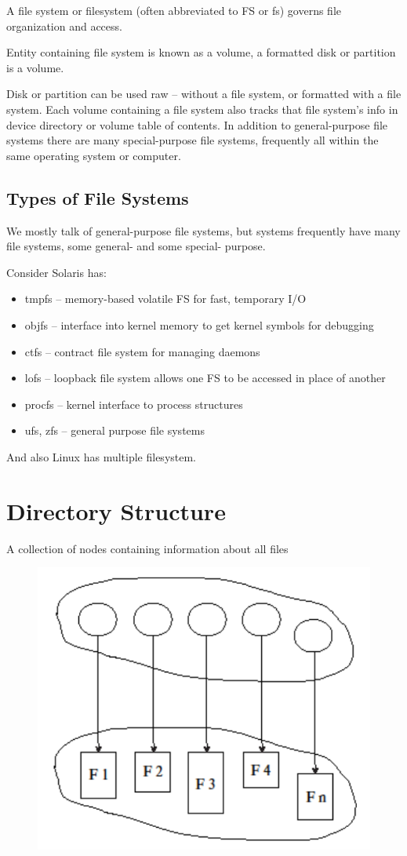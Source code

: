 A file system or filesystem (often abbreviated to FS or fs) governs
file organization and access.

Entity containing file system is known as a volume, a formatted disk or partition is a volume.

Disk or partition can be used raw – without a file system, or
formatted with a file system. Each volume containing a file system also tracks that file system’s
info in device directory or volume table of contents. In addition to general-purpose file systems there are many
special-purpose file systems, frequently all within the same
operating system or computer.

\subsection{Types of File Systems}
We mostly talk of general-purpose file systems, but systems frequently have many file systems, some general- and some
special- purpose.

Consider Solaris has:

\begin{itemize}
    \item tmpfs – memory-based volatile FS for fast, temporary I/O
    \item objfs – interface into kernel memory to get kernel symbols for debugging
    \item ctfs – contract file system for managing daemons
    \item lofs – loopback file system allows one FS to be accessed in place of another
    \item procfs – kernel interface to process structures
    \item ufs, zfs – general purpose file systems
\end{itemize}

And also Linux has multiple filesystem.


\section{Directory Structure}
A collection of nodes containing information about all files


\begin{figure}[h!]
    \centering
    \includegraphics[width=0.4\linewidth]{img/jhg.png}
\end{figure}

